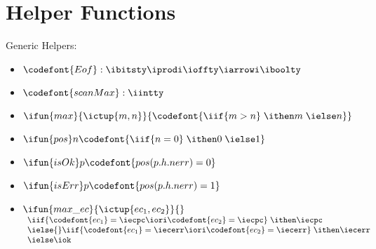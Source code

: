 \section{Helper Functions}
\label{app:asst-functions}



Generic Helpers:

{\small
\begin{itemize}
\renewcommand{\labelitemi}{}
\item $\codefont {Eof} : \ibitsty \iprodi \ioffty \iarrowi \iboolty$

\item $\codefont{scanMax} : \iintty$

\item $\ifun {max} {\ictup{m,n}} {\codefont{\iif {m>n}\; \ithen m\; \ielse n}}$
\item $\ifun {pos} n {\codefont{\iif {n=0}\; \ithen 0\; \ielse 1}}$
\item $\ifun {isOk} p {\codefont{pos(p.h.nerr) = 0}}$
\item $\ifun {isErr} p {\codefont{pos(p.h.nerr) = 1}}$

\item $\ifun {max\_ec} {\ictup{ec_1, ec_2}} {}$ \\
  $\begin{array}{l}
    \iif {\codefont{ec_1} = \iecpc \iori \codefont{ec_2} = \iecpc}\; \ithen \iecpc \\
    \ielse{} \iif {\codefont{ec_1} = \iecerr \iori \codefont{ec_2} = \iecerr}\; \ithen \iecerr \\
    \ielse \iok
   \end{array}$
\end{itemize}
}


